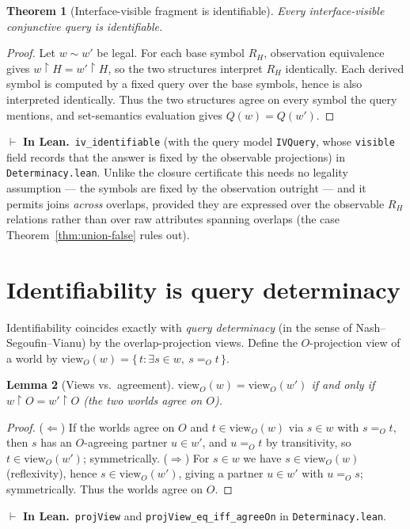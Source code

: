\documentclass[11pt]{article}
\newcommand{\proj}[2]{#1{\restriction}#2}    %
\newcommand{\lean}[1]{\texttt{#1}}           %
\theoremstyle{plain}
\newtheorem{theorem}{Theorem}
\newtheorem{lemma}[theorem]{Lemma}
\theoremstyle{definition}
\newcommand{\inlean}[1]{\par\smallskip\noindent%
  {\small\textcolor{blue!50!black}{$\vdash$ \textbf{In Lean.}}~#1}\par\smallskip}
\begin{document}
\begin{theorem}[Interface-visible fragment is identifiable]\label{thm:iv}
Every interface-visible conjunctive query is identifiable.
\end{theorem}
\begin{proof}
Let $w\sim w'$ be legal. For each base symbol $R_H$, observation equivalence gives
$\proj w H=\proj{w'} H$, so the two structures interpret $R_H$ identically. Each derived
symbol is computed by a fixed query over the base symbols, hence is also interpreted
identically. Thus the two structures agree on every symbol the query mentions, and
set-semantics evaluation gives $Q(w)=Q(w')$.
\end{proof}
\inlean{\lean{iv\_identifiable} (with the query model \lean{IVQuery}, whose \lean{visible}
field records that the answer is fixed by the observable projections) in
\lean{Determinacy.lean}. Unlike the closure certificate this needs no legality assumption ---
the symbols are fixed by the observation outright --- and it permits joins \emph{across}
overlaps, provided they are expressed over the observable $R_H$ relations rather than over raw
attributes spanning overlaps (the case Theorem~\ref{thm:union-false} rules out).}

\section{Identifiability is query determinacy}\label{sec:determinacy}

Identifiability coincides exactly with \emph{query determinacy} (in the sense of
Nash--Segoufin--Vianu) by the overlap-projection views. Define the $O$-projection view of a
world by $\mathrm{view}_O(w)=\{\,t : \exists s\in w,\ s=_O t\,\}$.

\begin{lemma}[Views vs.\ agreement]\label{lem:view-agree}
$\mathrm{view}_O(w)=\mathrm{view}_O(w')$ if and only if $\proj w O=\proj{w'} O$ (the two
worlds agree on $O$).
\end{lemma}
\begin{proof}
($\Leftarrow$) If the worlds agree on $O$ and $t\in\mathrm{view}_O(w)$ via $s\in w$ with
$s=_O t$, then $s$ has an $O$-agreeing partner $u\in w'$, and $u=_O t$ by transitivity, so
$t\in\mathrm{view}_O(w')$; symmetrically. ($\Rightarrow$) For $s\in w$ we have
$s\in\mathrm{view}_O(w)$ (reflexivity), hence $s\in\mathrm{view}_O(w')$, giving a partner
$u\in w'$ with $u=_O s$; symmetrically. Thus the worlds agree on $O$.
\end{proof}
\inlean{\lean{projView} and \lean{projView\_eq\_iff\_agreeOn} in \lean{Determinacy.lean}.}
\end{document}
